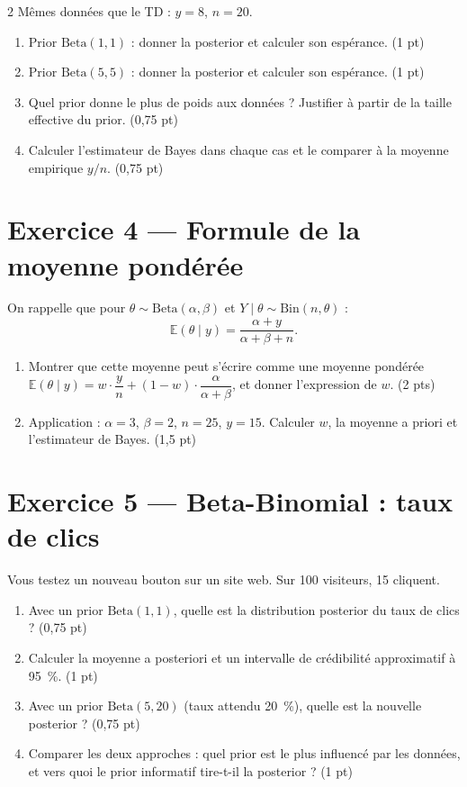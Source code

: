 \documentclass[9pt]{extarticle}
\begin{document}
\begin{multicols}{2}
Mêmes données que le TD : $y = 8$, $n = 20$.

\begin{enumerate}[label=\alph*)]
  \item Prior $\mathrm{Beta}(1, 1)$ : donner la posterior et calculer son espérance. \hfill (1 pt)
  \item Prior $\mathrm{Beta}(5, 5)$ : donner la posterior et calculer son espérance. \hfill (1 pt)
  \item Quel prior donne le plus de poids aux données ? Justifier à partir de la taille effective du prior. \hfill (0,75 pt)
  \item Calculer l'estimateur de Bayes dans chaque cas et le comparer à la moyenne empirique $y/n$. \hfill (0,75 pt)
\end{enumerate}

\columnbreak
\section*{Exercice 4 --- Formule de la moyenne pondérée}

On rappelle que pour $\theta \sim \mathrm{Beta}(\alpha, \beta)$ et $Y \mid \theta \sim \mathrm{Bin}(n, \theta)$ :
\[
\mathbb{E}(\theta \mid y) = \frac{\alpha + y}{\alpha + \beta + n}.
\]

\begin{enumerate}[label=\alph*)]
  \item Montrer que cette moyenne peut s'écrire comme une moyenne pondérée
        $\mathbb{E}(\theta \mid y) = w \cdot \dfrac{y}{n} + (1 - w) \cdot \dfrac{\alpha}{\alpha + \beta}$,
        et donner l'expression de $w$. \hfill (2 pts)
  \item Application : $\alpha = 3$, $\beta = 2$, $n = 25$, $y = 15$. Calculer $w$, la moyenne a priori et l'estimateur de Bayes. \hfill (1,5 pt)
\end{enumerate}

\section*{Exercice 5 --- Beta-Binomial : taux de clics}

Vous testez un nouveau bouton sur un site web. Sur 100 visiteurs, 15 cliquent.

\begin{enumerate}[label=\alph*)]
  \item Avec un prior $\mathrm{Beta}(1, 1)$, quelle est la distribution posterior du taux de clics ? \hfill (0,75 pt)
  \item Calculer la moyenne a posteriori et un intervalle de crédibilité approximatif à 95~\%. \hfill (1 pt)
  \item Avec un prior $\mathrm{Beta}(5, 20)$ (taux attendu 20~\%), quelle est la nouvelle posterior ? \hfill (0,75 pt)
  \item Comparer les deux approches : quel prior est le plus influencé par les données, et vers quoi le prior informatif tire-t-il la posterior ? \hfill (1 pt)
\end{enumerate}


\end{multicols}
\end{document}
